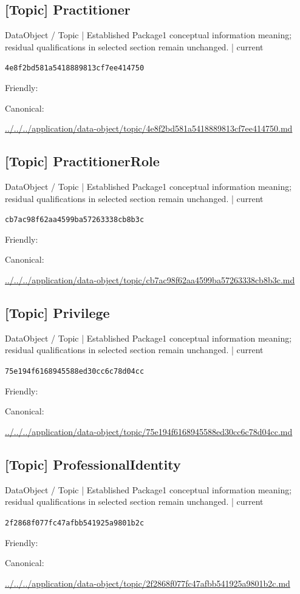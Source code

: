 \documentclass[10pt,a4paper]{article}
\begin{document}
\subsection*{[Topic] Practitioner}
{\small DataObject / Topic | Established Package1 conceptual information meaning; residual qualifications in selected section remain unchanged. | current}\par
\texttt{4e8f2bd581a5418889813cf7ee414750}\par
Friendly: \par
Canonical: \par
{\footnotesize\url{../../../application/data-object/topic/4e8f2bd581a5418889813cf7ee414750.md}}\par
\subsection*{[Topic] PractitionerRole}
{\small DataObject / Topic | Established Package1 conceptual information meaning; residual qualifications in selected section remain unchanged. | current}\par
\texttt{cb7ac98f62aa4599ba57263338cb8b3c}\par
Friendly: \par
Canonical: \par
{\footnotesize\url{../../../application/data-object/topic/cb7ac98f62aa4599ba57263338cb8b3c.md}}\par
\subsection*{[Topic] Privilege}
{\small DataObject / Topic | Established Package1 conceptual information meaning; residual qualifications in selected section remain unchanged. | current}\par
\texttt{75e194f6168945588ed30cc6c78d04cc}\par
Friendly: \par
Canonical: \par
{\footnotesize\url{../../../application/data-object/topic/75e194f6168945588ed30cc6c78d04cc.md}}\par
\subsection*{[Topic] ProfessionalIdentity}
{\small DataObject / Topic | Established Package1 conceptual information meaning; residual qualifications in selected section remain unchanged. | current}\par
\texttt{2f2868f077fc47afbb541925a9801b2c}\par
Friendly: \par
Canonical: \par
{\footnotesize\url{../../../application/data-object/topic/2f2868f077fc47afbb541925a9801b2c.md}}\par
\end{document}
